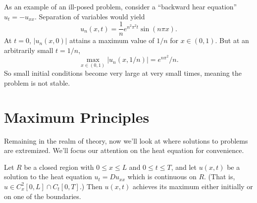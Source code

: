 \documentclass[../m180main.tex]{subfiles}
\begin{document}
As an example of an ill-posed problem, consider a ``backward hear equation'' $u_t = -u_{xx}$.
Separation of variables would yield \vspace{-5pt}
\[ u_n(x,t) = \frac{1}{n} e^{n^2 \pi^2 t} \sin(n\pi x). \]
At $t=0$, $|u_n(x,0)|$ attains a maximum value of $1 / n$ for $x \in (0,1)$.
But at an arbitrarily small $t = 1 / n$,
\[ \max_{x \in (0,1)} \left| u_n(x , 1 / n) \right| = e^{n\pi^2} / n. \]
So small initial conditions become very large at very small times, meaning the problem is not stable.

\section{Maximum Principles}
Remaining in the realm of theory, now we'll look at where solutions to problems are extremized.
We'll focus our attention on the heat equation for convenience.

\begin{theorem}
    Let $R$ be a closed region with $0 \leq x \leq L$ and $0 \leq t \leq T$, and let $u(x,t)$ be a solution to the heat equation $u_t = Du_{xx}$ which is continuous on $R$.
    (That is, $u \in C_x^2[0,L] \cap C_t[0,T]$.)
    Then $u(x,t)$ achieves its maximum either initially or on one of the boundaries.
\end{theorem}
\end{document}
